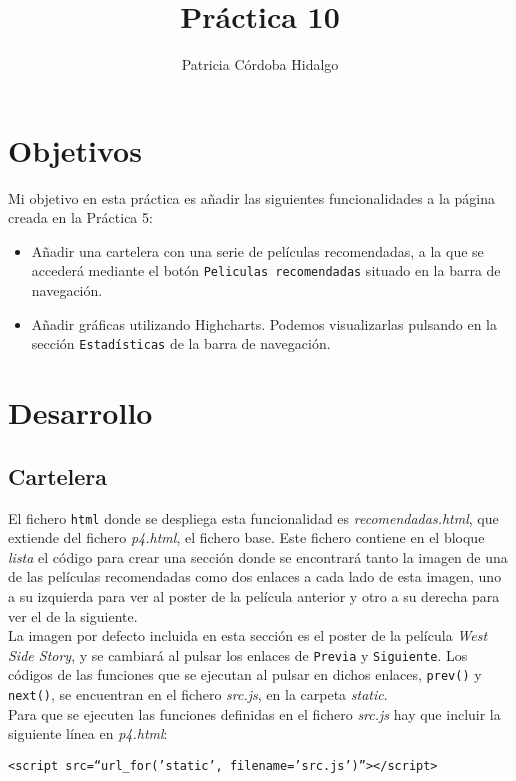 \documentclass{article}
\begin{document}
\title{Práctica 10}
\author{Patricia Córdoba Hidalgo}
\date{}
\maketitle

\section{Objetivos}

Mi objetivo en esta práctica es añadir las siguientes funcionalidades a la página creada en la Práctica 5:
\begin{itemize}
\item Añadir una cartelera con una serie de películas recomendadas, a la que se accederá mediante el botón \texttt{Peliculas recomendadas} situado en la barra de navegación.
\item Añadir gráficas utilizando Highcharts. Podemos visualizarlas pulsando en la sección \texttt{Estadísticas} de la barra de navegación.
\end{itemize}

\section{Desarrollo}

\subsection{Cartelera}

El fichero \texttt{html} donde se despliega esta funcionalidad es \textit{recomendadas.html}, que extiende del fichero \textit{p4.html}, el fichero base. Este fichero contiene en el bloque \textit{lista} el código para crear una sección donde se encontrará tanto la imagen de una de las películas recomendadas como dos enlaces a cada lado de esta imagen, uno a su izquierda para ver al poster de la película anterior y otro a su derecha para ver el de la siguiente.\\

La imagen por defecto incluida en esta sección es el poster de la película \textit{West Side Story}, y se cambiará al pulsar los enlaces de \texttt{Previa} y \texttt{Siguiente}. Los códigos de las funciones que se ejecutan al pulsar en dichos enlaces, \texttt{prev()} y \texttt{next()}, se encuentran en el fichero \textit{src.js}, en la carpeta \textit{static}.\\

Para que se ejecuten las funciones definidas en el fichero \textit{src.js} hay que incluir la siguiente línea en \textit{p4.html}:
\begin{center}
  \texttt{<script src=``{{url\_for('static', filename='src.js')}}''></script>}
\end{center}
\end{document}
